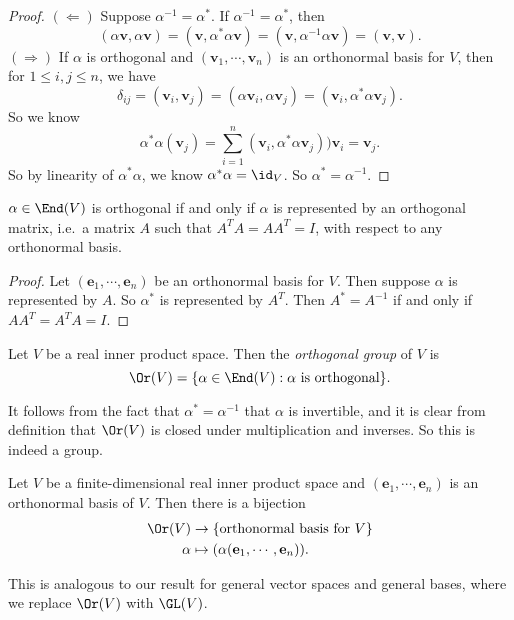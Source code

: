 \documentclass[a4paper]{article}
\begin{document}
\begin{proof}
  $(\Leftarrow)$ Suppose $\alpha^{-1} = \alpha^*$. If $\alpha^{-1} = \alpha^*$, then
  \[
    (\alpha \mathbf{v}, \alpha \mathbf{v}) = (\mathbf{v}, \alpha^* \alpha \mathbf{v}) = (\mathbf{v}, \alpha^{-1} \alpha \mathbf{v}) = (\mathbf{v}, \mathbf{v}).
  \]
  $(\Rightarrow)$ If $\alpha$ is orthogonal and $(\mathbf{v}_1, \cdots, \mathbf{v}_n)$ is an orthonormal basis for $V$, then for $1 \leq i, j \leq n$, we have
  \[
    \delta_{ij} = (\mathbf{v}_i, \mathbf{v}_j) = (\alpha \mathbf{v}_i, \alpha \mathbf{v}_j) = (\mathbf{v}_i, \alpha^* \alpha \mathbf{v}_j).
  \]
  So we know
  \[
    \alpha^* \alpha (\mathbf{v}_j) = \sum_{i = 1}^n (\mathbf{v}_i, \alpha^* \alpha \mathbf{v}_j)) \mathbf{v}_i = \mathbf{v}_j.
  \]
  So by linearity of $\alpha^* \alpha$, we know $\alpha^* \alpha = \id_V$. So $\alpha^* = \alpha^{-1}$.
\end{proof}

\begin{cor}
  $\alpha \in \End(V)$ is orthogonal if and only if $\alpha$ is represented by an orthogonal matrix, i.e.\ a matrix $A$ such that $A^T A = AA^T = I$, with respect to any orthonormal basis.
\end{cor}

\begin{proof}
  Let $(\mathbf{e}_1, \cdots, \mathbf{e}_n)$ be an orthonormal basis for $V$. Then suppose $\alpha$ is represented by $A$. So $\alpha^*$ is represented by $A^T$. Then $A^* = A^{-1}$ if and only if $AA^T = A^T A = I$.
\end{proof}

\begin{defi}
  Let $V$ be a real inner product space. Then the \emph{orthogonal group} of $V$ is
  \[
    \Or(V) = \{\alpha \in \End(V): \alpha\text{ is orthogonal}\}.
  \]
\end{defi}
It follows from the fact that $\alpha^* = \alpha^{-1}$ that $\alpha$ is invertible, and it is clear from definition that $\Or(V)$ is closed under multiplication and inverses. So this is indeed a group.

\begin{prop}
  Let $V$ be a finite-dimensional real inner product space and $(\mathbf{e}_1, \cdots, \mathbf{e}_n)$ is an orthonormal basis of $V$. Then there is a bijection
  \begin{align*}
    \Or(V) &\to \{\text{orthonormal basis for }V\}\\
    \alpha &\mapsto (\alpha(\mathbf{e}_1, \cdots, \mathbf{e}_n)).
  \end{align*}
\end{prop}
This is analogous to our result for general vector spaces and general bases, where we replace $\Or(V)$ with $\GL(V)$.
\end{document}
